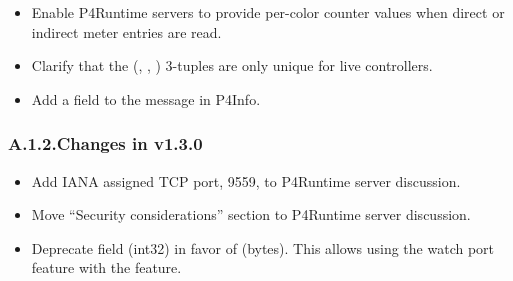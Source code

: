 \documentclass[11pt]{article}
\begin{document}
{\begin{itemize}[noitemsep,topsep=\mdcompacttopsep]
\item{}Enable P4Runtime servers to provide per-color counter values when direct or
indirect meter entries are read.%

\item{}Clarify that the (, , ) 3-tuples are only unique
for live controllers.%

\item{}Add a  field to the  message
in P4Info.%
\end{itemize}%

\subsubsection{A.1.2.\hspace*{0.5em}Changes in v1.3.0}\label{sec-changes-in-v130}%

\begin{itemize}[noitemsep,topsep=\mdcompacttopsep]%

\item{}Add IANA assigned TCP port, 9559, to P4Runtime server discussion.%

\item{}Move \textquotedblleft{}Security considerations\textquotedblright{} section to P4Runtime server discussion.%

\item{}Deprecate  field (int32) in favor of  (bytes). This allows
using the watch port feature with the  feature.%


\end{itemize}}
\end{document}
